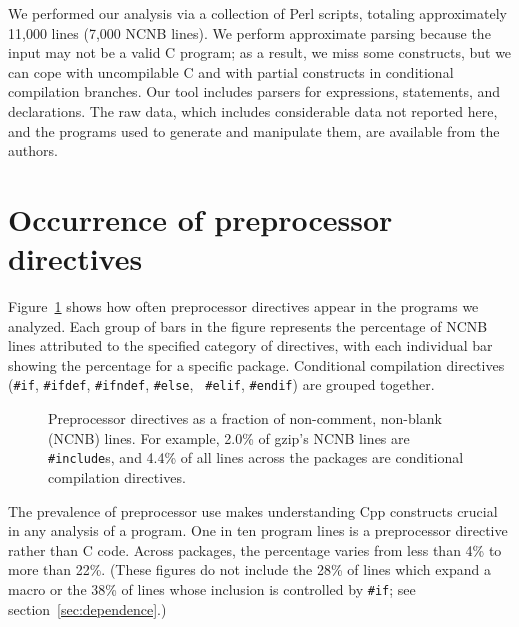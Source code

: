 \documentclass[10pt]{article}
\begin{document}

We performed our analysis via a collection of Perl scripts, totaling
approximately 11,000 lines (7,000 NCNB lines).  We perform approximate
parsing because the input may not be a valid C program; as a result, we
miss some constructs, but we can cope with uncompilable C and with partial
constructs in conditional compilation branches.  Our tool includes parsers
for expressions, statements, and declarations.  The raw data, which
includes considerable data not reported here, and the programs used to
generate and manipulate them, are available from the authors.


\section{Occurrence of preprocessor directives}
\label{sec:directives}
\label{sec:first-content-section}

Figure~\ref{fig:directives-breakdown} shows how often preprocessor
directives appear in the programs we analyzed.  Each group of bars in the
figure represents the percentage of NCNB lines
attributed to the specified category of directives, with each individual
bar showing the percentage for a specific package.  Conditional compilation
directives ({\tt \#if}, {\tt \#ifdef}, {\tt \#ifndef}, {\tt \#else}, {\tt
\#elif}, {\tt \#endif}) are grouped together.

\begin{figure}
\centerline{}
\caption{Preprocessor directives as a fraction of non-comment,
  non-blank (NCNB) lines.  For
  example, 2.0\% of gzip's NCNB lines are {\tt \#include}s, and 4.4\% of all
  lines across the packages are conditional compilation directives.}
\label{fig:directives-breakdown}
\end{figure}

The prevalence of preprocessor use makes understanding Cpp constructs
crucial in any analysis of a program.  One in ten program lines is a
preprocessor directive rather than C code.  Across
packages, the percentage varies from less than 4\% to more than 22\%.
(These figures do not include the 28\% of lines which expand a macro or the
38\% of lines whose inclusion is controlled by {\tt \#if}; see
section~\ref{sec:dependence}.)

\end{document}
